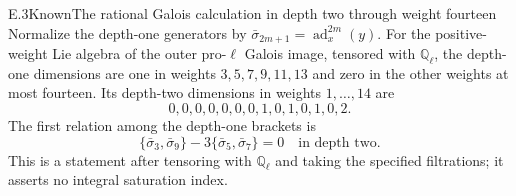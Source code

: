 \begin{statement}{E.3}{Known}{The rational Galois calculation in depth two through weight fourteen}
Normalize the depth-one generators by
$\bar\sigma_{2m+1}=\operatorname{ad}_x^{2m}(y)$.
For the positive-weight Lie algebra of the outer pro-$\ell$ Galois
image, tensored with $\mathbb Q_\ell$, the depth-one dimensions are
one in weights $3,5,7,9,11,13$ and zero in the other weights at most
fourteen. Its depth-two dimensions in weights $1,\ldots,14$ are
\[
 0,0,0,0,0,0,0,1,0,1,0,1,0,2.
\]
The first relation among the depth-one brackets is
\[
 \{\bar\sigma_3,\bar\sigma_9\}
       -3\{\bar\sigma_5,\bar\sigma_7\}=0
 \quad\text{in depth two}.
\]
This is a statement after tensoring with $\mathbb Q_\ell$ and taking
the specified filtrations; it asserts no integral saturation index.
\end{statement}
